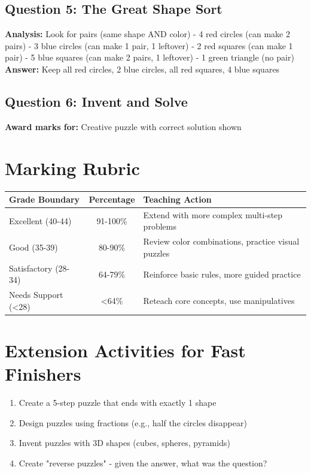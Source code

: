 \documentclass{article}
\begin{document}
\subsection*{Question 5: The Great Shape Sort}
\textbf{Analysis:} Look for pairs (same shape AND color)
- 4 red circles (can make 2 pairs)
- 3 blue circles (can make 1 pair, 1 leftover)  
- 2 red squares (can make 1 pair)
- 5 blue squares (can make 2 pairs, 1 leftover)
- 1 green triangle (no pair)
\textbf{Answer:} Keep all red circles, 2 blue circles, all red squares, 4 blue squares

\subsection*{Question 6: Invent and Solve}
\textbf{Award marks for:} Creative puzzle with correct solution shown

\section*{Marking Rubric}

\begin{tabular}{|l|c|l|}
\hline
\textbf{Grade Boundary} & \textbf{Percentage} & \textbf{Teaching Action} \\
\hline
Excellent (40-44) & 91-100\% & Extend with more complex multi-step problems \\
\hline
Good (35-39) & 80-90\% & Review color combinations, practice visual puzzles \\
\hline
Satisfactory (28-34) & 64-79\% & Reinforce basic rules, more guided practice \\
\hline
Needs Support (<28) & <64\% & Reteach core concepts, use manipulatives \\
\hline
\end{tabular}

\section*{Extension Activities for Fast Finishers}

\begin{enumerate}
    \item Create a 5-step puzzle that ends with exactly 1 shape
    \item Design puzzles using fractions (e.g., half the circles disappear)
    \item Invent puzzles with 3D shapes (cubes, spheres, pyramids)
    \item Create "reverse puzzles" - given the answer, what was the question?
\end{enumerate}
\end{document}
